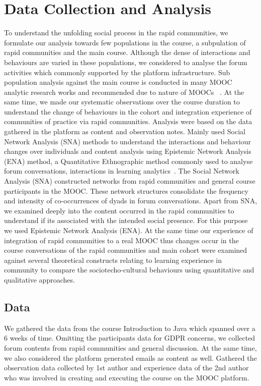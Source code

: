 \documentclass[manuscript,screen,review]{acmart}
\begin{document}
\section{Data Collection and Analysis}
To understand the unfolding social process in the rapid communities, we formulate our analysis towards few populations in the course, a subpulation of rapid communities and the main course. Although the dense of interactions and behaviours are varied in these populations, we considered to analyse the forum activities which commonly supported by the platform infrastructure. Sub population analysis against the main course is conducted in many MOOC analytic research works and recommended due to nature of MOOCs ~\cite{dowell2015modeling, joksimovic2015social, poquet2018social, oleksandra2016untangling}. At the same time, we made our systematic observations over the course duration to understand the change of behaviours in the cohort and integration experience of communities of practice via rapid communities. Analysis were based on the data gathered in the platform as content and observation notes. Mainly used Social Network Analysis (SNA) methods to understand the interactions and behaviour changes over individuals and content analysis using Epistemic Network Analysis (ENA) method, a Quantitative Ethnographic method commonly used to analyse forum conversations, interactions in learning analytics~\cite{shaffer2009epistemic}. The Social Network Analysis (SNA) constructed networks from rapid communities and general course participants in the MOOC. These network structures consolidate the frequency and intensity of co-occurrences of dyads in forum conversations. Apart from SNA, we examined deeply into the content occurred in the rapid communities to understand if its associated with the intended social presence. For this purpose we used Epistemic Network Analysis (ENA). At the same time our experience of integration of rapid communities to a real MOOC thus changes occur in the course conversations of the rapid communities and main cohort were examined against several theoretical constructs relating to learning experience in community  to compare the sociotecho-cultural behaviours using quantitative and qualitative approaches. 

\subsection{Data}
We gathered the data from the course Introduction to Java which spanned over a 6 weeks of time. Omitting the participants data for GDPR concerns, we collected forum contents from rapid communities and general discussion. At the same time, we also considered the platform generated emails as content as well. Gathered the observation data collected by 1st author and experience data of the 2nd author who was involved in creating and executing the course on the MOOC platform.  
\end{document}
